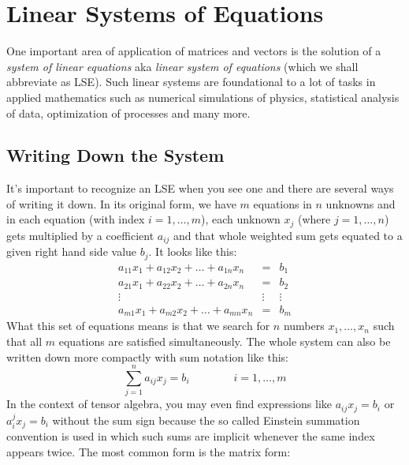 \section{Linear Systems of Equations}
One important area of application of matrices and vectors is the solution of a \emph{system of linear equations} aka \emph{linear system of equations} (which we shall abbreviate as LSE). Such linear systems are foundational to a lot of tasks in applied mathematics such as numerical simulations of physics, statistical analysis of data, optimization of processes and many more. 

\subsection{Writing Down the System}
It's important to recognize an LSE when you see one and there are several ways of writing it down. In its original form, we have  $m$ equations in $n$ unknowns and in each equation (with index $i = 1,\ldots, m$), each unknown $x_j$ (where $j=1,\ldots,n$) gets multiplied by a coefficient $a_{ij}$ and that whole weighted sum gets equated to a given right hand side value $b_j$. It looks like this:
\begin{eqnarray}
a_{11} x_1 + a_{12} x_2 + \ldots + a_{1n} x_n &=& b_1    \\
a_{21} x_1 + a_{22} x_2 + \ldots + a_{2n} x_n &=& b_2    \\
                                       \vdots &\vdots& \vdots \\
a_{m1} x_1 + a_{m2} x_2 + \ldots + a_{mn} x_n &=& b_m 
\end{eqnarray}
What this set of equations means is that we search for $n$ numbers $x_1, \ldots, x_n$ such that all $m$ equations are satisfied simultaneously. The whole system can also be written down more compactly with sum notation like this:
\begin{equation}
\sum_{j=1}^n a_{ij} x_j = b_i \qquad \qquad i=1, \ldots, m
\end{equation}
In the context of tensor algebra, you may even find expressions like $a_{ij} x_j = b_i$ or $a_i^j x_j = b_i$ without the sum sign because the so called Einstein summation convention is used in which such sums are implicit whenever the same index appears twice. The most common form is the matrix form:
